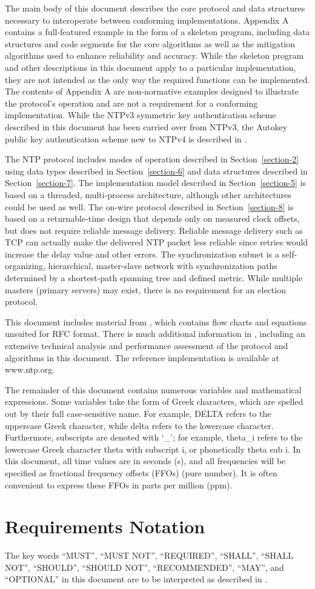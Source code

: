 The main body of this document describes the core protocol and data
structures necessary to interoperate between conforming
implementations. Appendix A contains a full-featured example in the
form of a skeleton program, including data structures and code
segments for the core algorithms as well as the mitigation algorithms
used to enhance reliability and accuracy. While the skeleton program
and other descriptions in this document apply to a particular
implementation, they are not intended as the only way the required
functions can be implemented. The contents of Appendix A are non-normative
examples designed to illustrate the protocol's operation
and are not a requirement for a conforming implementation. While the
NTPv3 symmetric key authentication scheme described in this document
has been carried over from NTPv3, the Autokey public key
authentication scheme new to NTPv4 is described in \cite{RFC5906}.

The NTP protocol includes modes of operation described in Section~\ref{section-2}
using data types described in Section~\ref{section-6} and data structures described
in Section~\ref{section-7}. The implementation model described in Section~\ref{section-5} is
based on a threaded, multi-process architecture, although other
architectures could be used as well. The on-wire protocol described
in Section~\ref{section-8} is based on a returnable-time design that depends only
on measured clock offsets, but does not require reliable message
delivery. Reliable message delivery such as TCP \cite{RFC0793} can
actually make the delivered NTP packet less reliable since retries
would increase the delay value and other errors. The synchronization
subnet is a self-organizing, hierarchical, master-slave network with
synchronization paths determined by a shortest-path spanning tree and
defined metric. While multiple masters (primary servers) may exist,
there is no requirement for an election protocol.

This document includes material from \cite{ref9}, which contains flow
charts and equations unsuited for RFC format. There is much
additional information in \cite{ref7}, including an extensive technical
analysis and performance assessment of the protocol and algorithms in
this document. The reference implementation is available at
www.ntp.org.

The remainder of this document contains numerous variables and
mathematical expressions. Some variables take the form of Greek
characters, which are spelled out by their full case-sensitive name.
For example, DELTA refers to the uppercase Greek character, while
delta refers to the lowercase character. Furthermore, subscripts are
denoted with `\_'; for example, theta\_i refers to the lowercase Greek
character theta with subscript i, or phonetically theta sub i. In
this document, all time values are in seconds (s), and all
frequencies will be specified as fractional frequency offsets (FFOs)
(pure number). It is often convenient to express these FFOs in parts
per million (ppm).

\section{Requirements Notation}
\label{section-1-1}

The key words ``MUST'', ``MUST NOT'', ``REQUIRED'', ``SHALL'', ``SHALL NOT'',
``SHOULD'', ``SHOULD NOT'', ``RECOMMENDED'', ``MAY'', and ``OPTIONAL'' in this
document are to be interpreted as described in \cite{RFC2119}.
